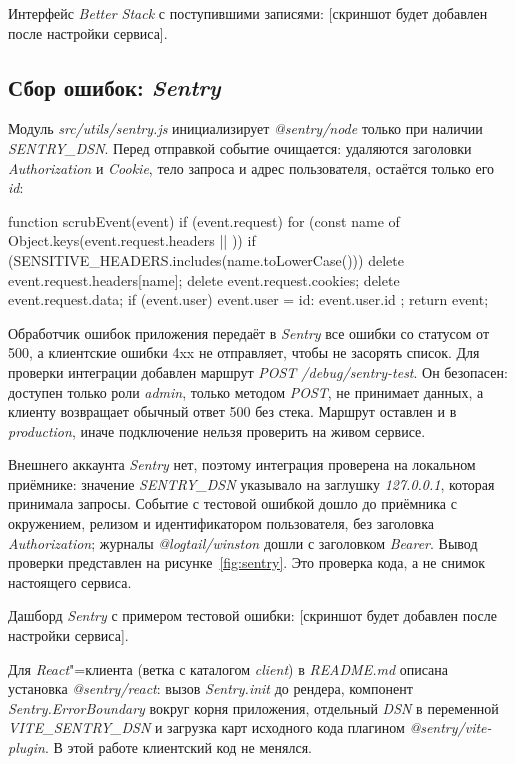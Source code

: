 \documentclass{stp}
\newcommand{\en}[1]{\textit{#1}}
\newcommand{\pending}{[скриншот будет добавлен после настройки сервиса]}
\begin{document}
Интерфейс \en{Better Stack} с поступившими записями: \pending.

\subsection{Сбор ошибок: \en{Sentry}}

Модуль \en{src/utils/sentry.js} инициализирует \en{@sentry/node} только при
наличии \en{SENTRY\_DSN}. Перед отправкой событие очищается: удаляются
заголовки \en{Authorization} и \en{Cookie}, тело запроса и адрес пользователя,
остаётся только его \en{id}:

\begin{stplisting}
function scrubEvent(event) {
  if (event.request) {
    for (const name of Object.keys(event.request.headers || {})) {
      if (SENSITIVE_HEADERS.includes(name.toLowerCase())) {
        delete event.request.headers[name];
      }
    }
    delete event.request.cookies;
    delete event.request.data;
  }
  if (event.user) event.user = { id: event.user.id };
  return event;
}
\end{stplisting}

Обработчик ошибок приложения передаёт в \en{Sentry} все ошибки со статусом
от 500, а клиентские ошибки 4xx не отправляет, чтобы не засорять список.
Для проверки интеграции добавлен маршрут \en{POST /debug/sentry-test}. Он
безопасен: доступен только роли \en{admin}, только методом \en{POST}, не
принимает данных, а клиенту возвращает обычный ответ 500 без стека. Маршрут
оставлен и в \en{production}, иначе подключение нельзя проверить на живом
сервисе.

Внешнего аккаунта \en{Sentry} нет, поэтому интеграция проверена на локальном
приёмнике: значение \en{SENTRY\_DSN} указывало на заглушку
\en{127.0.0.1}, которая принимала запросы. Событие с тестовой ошибкой дошло до
приёмника с окружением, релизом и идентификатором пользователя, без
заголовка \en{Authorization}; журналы \en{@logtail/winston} дошли с
заголовком \en{Bearer}. Вывод проверки представлен на
рисунке~\ref{fig:sentry}. Это проверка кода, а не снимок настоящего сервиса.


Дашборд \en{Sentry} с примером тестовой ошибки: \pending.

Для \en{React}"=клиента (ветка с каталогом \en{client}) в \en{README.md}
описана установка \en{@sentry/react}: вызов \en{Sentry.init} до рендера,
компонент \en{Sentry.ErrorBoundary} вокруг корня приложения, отдельный
\en{DSN} в переменной \en{VITE\_SENTRY\_DSN} и загрузка карт исходного кода
плагином \en{@sentry/vite-plugin}. В этой работе клиентский код не менялся.
\end{document}
